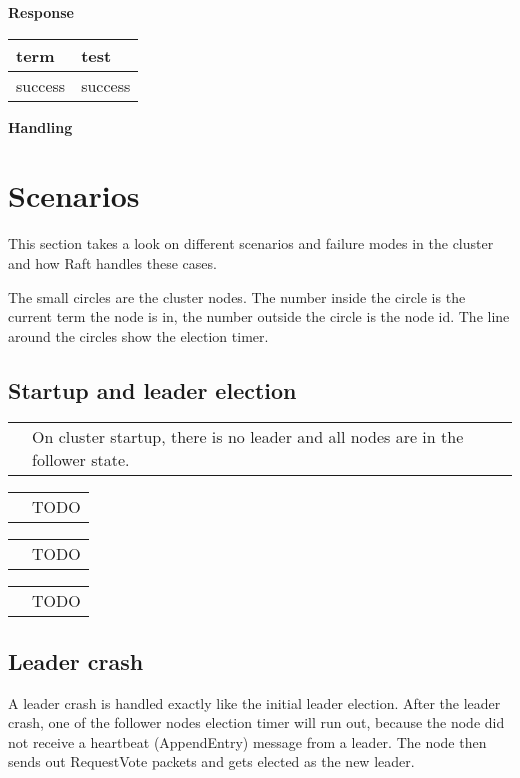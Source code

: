 \textbf{Response}

\begin{tabular}{ | l | p{13.7cm} | }
\hline
term & test \\ \hline
success & success \\ \hline
\end{tabular}

\textbf{Handling}





\section{Scenarios}
This section takes a look on different scenarios and failure modes in the cluster and how Raft handles these cases.

The small circles are the cluster nodes. The number inside the circle is the current term the node is in, the number outside the circle is the node id. The line around the circles show the election timer.

\subsection{Startup and leader election}

\begin{tabularx}{\textwidth}{  p{150px}  X  }
  \noindent\parbox[c]{\hsize}{
  \def\svgwidth{150}
  
  } & On cluster startup, there is no leader and all nodes are in the follower state.
\end{tabularx}

\begin{tabularx}{\textwidth}{  p{150px}  X  }
  \noindent\parbox[c]{\hsize}{
  \def\svgwidth{150}
  
  } & TODO
\end{tabularx}

\begin{tabularx}{\textwidth}{  p{150px}  X  }
  \noindent\parbox[c]{\hsize}{
  \def\svgwidth{150}
  
  } & TODO
\end{tabularx}

\begin{tabularx}{\textwidth}{  p{150px}  X  }
  \noindent\parbox[c]{\hsize}{
  \def\svgwidth{150}
  
  } &TODO
\end{tabularx}



\subsection{Leader crash}
A leader crash is handled exactly like the initial leader election.
After the leader crash, one of the follower nodes election timer will run out, because the node did not receive a heartbeat (AppendEntry) message from a leader. The node then sends out 
RequestVote packets and gets elected as the new leader.

